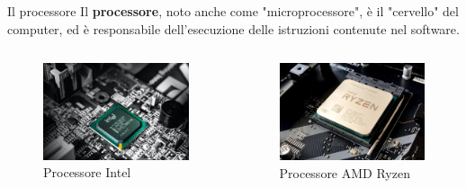 \begin{frame}
	
	\begin{block}{Il processore}
		Il \textbf{processore}, noto anche come "microprocessore", è il "cervello" del computer, ed è responsabile dell'esecuzione delle istruzioni contenute nel software.
	\end{block}

	\begin{columns}			
		\begin{figure}[!htbp] 
			\centering
			\includegraphics[width=1.0\linewidth]{images/2_le_architetture/intel.jpg}
			\caption{Processore Intel}
			\label{fig:architectures_intel}
		\end{figure}
					
		\begin{figure}[!htbp] 
			\centering
			\includegraphics[width=1.0\linewidth]{images/2_le_architetture/ryzen.jpg}
			\caption{Processore AMD Ryzen}
			\label{fig:architectures_ryzen}
		\end{figure}
		
	\end{columns}
	
\end{frame}




